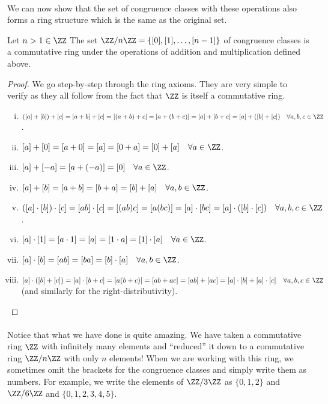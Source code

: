 \documentclass[../abstract_algebra.tex]{subfiles}
\begin{document}
        \paragraph{}
        We can now show that the set of congruence classes with these operations also forms a ring structure which is the same as the original set.
        \begin{theorem}
            Let $n>1\in\ZZ$ The set $\ZZ/n\ZZ=\{[0],[1],\dots,[n-1]\}$ of congruence classes is a commutative ring under the operations of addition and multiplication defined above.
        \end{theorem}
        \begin{proof}
            We go step-by-step through the ring axioms.
            They are very simple to verify as they all follow from the fact that $\ZZ$ is itself a commutative ring.
            \begin{enumerate}[(i)]
                \item $([a]+[b])+[c]=[a+b]+[c]=[(a+b)+c]=[a+(b+c)]=[a]+[b+c]=[a]+([b]+[c])\quad\forall a,b,c\in\ZZ$.
                \item $[a]+[0]=[a+0]=[a]=[0+a]=[0]+[a]\quad\forall a\in\ZZ$.
                \item $[a]+[-a]=[a+(-a)]=[0]\quad\forall a\in\ZZ$.
                \item $[a]+[b]=[a+b]=[b+a]=[b]+[a]\quad\forall a,b\in\ZZ$.
                \item $([a]\cdot[b])\cdot[c]=[ab]\cdot[c]=[(ab)c]=[a(bc)]=[a]\cdot[bc]=[a]\cdot([b]\cdot[c])\quad\forall a,b,c\in\ZZ$.
                \item $[a]\cdot[1]=[a\cdot 1]=[a]=[1\cdot a]=[1]\cdot[a]\quad\forall a\in\ZZ$.
                \item $[a]\cdot[b]=[ab]=[ba]=[b]\cdot[a]\quad\forall a,b\in\ZZ$.
                \item $[a]\cdot([b]+[c])=[a]\cdot[b+c]=[a(b+c)]=[ab+ac]=[ab]+[ac]=[a]\cdot[b]+[a]\cdot[c]\quad\forall a,b,c\in\ZZ$ (and similarly for the right-distributivity).
            \end{enumerate}
        \end{proof}

        \paragraph{}
        Notice that what we have done is quite amazing.
        We have taken a commutative ring $\ZZ$ with infinitely many elements and ``reduced'' it down to a commutative ring $\ZZ/n\ZZ$ with only $n$ elements!
        When we are working with this ring, we sometimes omit the brackets for the congruence classes and simply write them as numbers.
        For example, we write the elements of $\ZZ/3\ZZ$ as $\{0,1,2\}$ and $\ZZ/6\ZZ$ and $\{0,1,2,3,4,5\}$.
         
\end{document}

